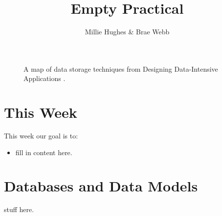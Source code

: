\documentclass{csse4400}
\title{Empty Practical}
\author{Millie Hughes \& Brae Webb}
\date{\week{0}}
\begin{document}
\maketitle

\begin{figure}[h]
  \href{https://www.oreilly.com/library/view/designing-data-intensive-applications/9781491903063/ch02.html}{
  }
\caption{A map of data storage techniques from Designing Data-Intensive Applications \cite{data-intensive}.}
\end{figure}

\section{This Week}
This week our goal is to:
\begin{itemize}
  \item fill in content here.
\end{itemize}

\section{Databases and Data Models}
stuff here.





\end{document}
